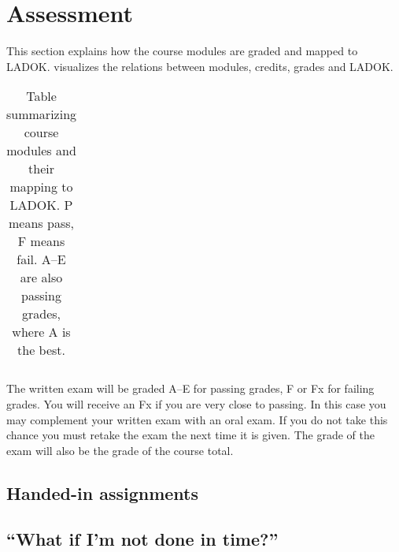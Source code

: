 \section{Assessment}%
\label{Assessment}


This section explains how the course modules are graded and mapped to LADOK\@.
 visualizes the relations between modules, credits, grades and 
LADOK\@.

\begin{frame}
\begin{table}
  \centering
  \setlength{\tabcolsep}{0.5em}
  \begin{tabular}{r r l l}
    \toprule
    
    \bottomrule
  \end{tabular}
  \caption{%
    Table summarizing course modules and their mapping to LADOK\@.
    P means pass, F means fail.
    A--E are also passing grades, where A is the best.
  }\label{LADOKTable}
\end{table}
\end{frame}

The written exam will be graded A--E for passing grades, F or Fx for failing 
grades.
You will receive an Fx if you are very close to passing.
In this case you may complement your written exam with an oral exam.
If you do not take this chance you must retake the exam the next 
time it is given.
The grade of the exam will also be the grade of the course total.

\subsection{Handed-in assignments}


\subsection{\enquote{What if I'm not done in time?}}%
\label{sec:late}



\printbibliography{}
